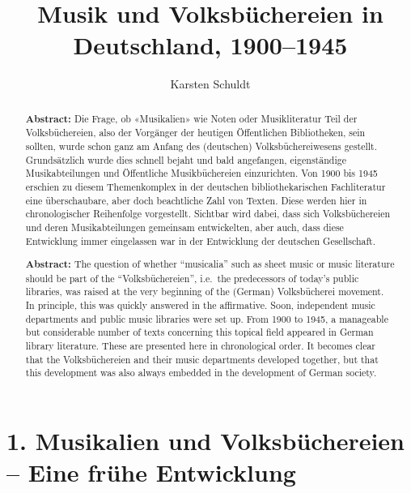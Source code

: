 \documentclass[a4paper,
fontsize=11pt,
oneside,
numbers=noperiodatend,
parskip=half-,
bibliography=totoc,
final
]{scrartcl}
\title{\LARGE{Musik und Volksbüchereien in Deutschland, 1900–1945}}%
\author{Karsten Schuldt} %
\date{}
\begin{document}
\maketitle
\thispagestyle{fancyplain} 

\begin{abstract}
\noindent
\textbf{Abstract:} Die Frage, ob «Musikalien» wie Noten oder
Musikliteratur Teil der Volksbüchereien, also der Vorgänger der heutigen
Öffentlichen Bibliotheken, sein sollten, wurde schon ganz am Anfang des
(deutschen) Volksbüchereiwesens gestellt. Grundsätzlich wurde dies
schnell bejaht und bald angefangen, eigenständige Musikabteilungen und
Öffentliche Musikbüchereien einzurichten. Von 1900 bis 1945 erschien zu
diesem Themenkomplex in der deutschen bibliothekarischen Fachliteratur
eine überschaubare, aber doch beachtliche Zahl von Texten. Diese werden
hier in chronologischer Reihenfolge vorgestellt. Sichtbar wird dabei,
dass sich Volksbüchereien und deren Musikabteilungen gemeinsam
entwickelten, aber auch, dass diese Entwicklung immer eingelassen war in
der Entwicklung der deutschen Gesellschaft.

\textbf{Abstract:} The question of whether ``musicalia'' such as sheet
music or music literature should be part of the ``Volksbüchereien'',
i.e.~the predecessors of today's public libraries, was raised at the
very beginning of the (German) Volksbücherei movement. In principle,
this was quickly answered in the affirmative. Soon, independent music
departments and public music libraries were set up. From 1900 to 1945, a
manageable but considerable number of texts concerning this topical
field appeared in German library literature. These are presented here in
chronological order. It becomes clear that the Volksbüchereien and their
music departments developed together, but that this development was also
always embedded in the development of German society.
\end{abstract}

\hypertarget{musikalien-und-volksbuxfcchereien-eine-fruxfche-entwicklung}{%
\section{1. Musikalien und Volksbüchereien -- Eine frühe
Entwicklung}\label{musikalien-und-volksbuxfcchereien-eine-fruxfche-entwicklung}}
\end{document}
